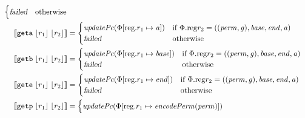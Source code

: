 \documentclass[a4paper]{article}
\newcommand{\update}[2]{[#1 \mapsto #2]}
\newcommand{\sem}[1]{\left\llbracket #1 \right\rrbracket}
\newcommand{\var}[1]{\mathit{#1}}
\newcommand{\gl}{\var{g}}
\newcommand{\addr}{\var{a}}
\newcommand{\start}{\var{base}}
\newcommand{\addrend}{\var{end}}
\newcommand{\perm}{\var{perm}}
\newcommand{\stdcap}[1][(\perm,\gl)]{\left(#1,\start,\addrend,\addr \right)}
\newcommand{\plainproj}[1]{\mathrm{#1}}
\newcommand{\memreg}[1][\Phi]{#1.\plainproj{reg}}
\newcommand{\updateReg}[3][\Phi]{#1\update{\plainproj{reg}.#2}{#3}}
\newcommand{\failed}{\textsl{failed}}
\newcommand{\plainfun}[2]{
  \ifthenelse{\equal{#2}{}}
             {\mathit{#1}}
             {\mathit{#1}(#2)}
}
\newcommand{\encodePerm}{\mathit{encodePerm}}
\newcommand{\stdUpdatePc}[1]{\plainfun{updatePc}{#1}}
\newcommand{\refreg}[1]{\lfloor #1 \rfloor}
\newcommand{\zinstr}[1]{\mathtt{#1}}
\newcommand{\twoinstr}[3]{\zinstr{#1} \; #2 \; #3}
\newcommand{\geta}[2]{\twoinstr{geta}{#1}{#2}}
\newcommand{\getb}[2]{\twoinstr{getb}{#1}{#2}}
\newcommand{\gete}[2]{\twoinstr{gete}{#1}{#2}}
\newcommand{\getp}[2]{\twoinstr{getp}{#1}{#2}}
\begin{document}
\begin{align*}
\begin{cases}
                                              \failed & \text{otherwise}
                                            \end{cases}
 \\
  \sem{\geta{\refreg{r_1}}{\refreg{r_2}}} & = 
                          \begin{cases}
                            \stdUpdatePc{\updateReg{r_1}{\addr}} &
                            \arraycolsep=0pt
                            \begin{array}[t]{l}
                              \text{if $\memreg{r_2} = \stdcap$}
                            \end{array} \\
                            \failed & \text{otherwise}
                          \end{cases}
  \\
  \sem{\getb{\refreg{r_1}}{\refreg{r_2}}} & = 
                          \begin{cases}
                            \stdUpdatePc{\updateReg{r_1}{\start}} &
                            \arraycolsep=0pt
                            \begin{array}[t]{l}
                              \text{if $\memreg{r_2} = \stdcap$}
                            \end{array} \\
                            \failed & \text{otherwise}
                          \end{cases}
  \\
  \sem{\gete{\refreg{r_1}}{\refreg{r_2}}} & = 
                          \begin{cases}
                            \stdUpdatePc{\updateReg{r_1}{\addrend}} &
                            \arraycolsep=0pt
                            \begin{array}[t]{l}
                              \text{if $\memreg{r_2} = \stdcap$}
                            \end{array} \\
                            \failed & \text{otherwise}
                          \end{cases}
  \\
  \sem{\getp{\refreg{r_1}}{\refreg{r_2}}} & = 
                          \begin{cases}
                            \stdUpdatePc{\updateReg{r_1}{\encodePerm(\perm)}} &
                            \arraycolsep=0pt
                            \begin{array}[t]{l}

\end{array}
\end{cases}
\end{align*}
\end{document}
